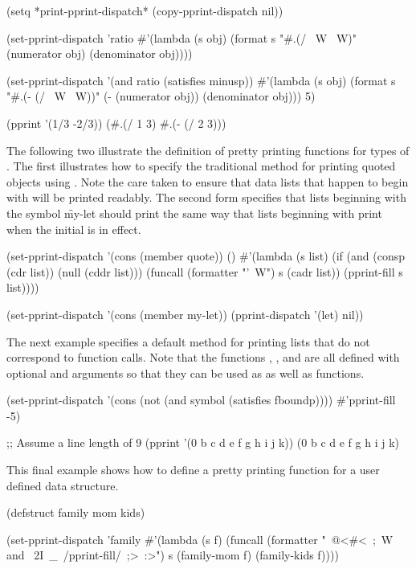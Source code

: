 \code
 (setq *print-pprint-dispatch* (copy-pprint-dispatch nil))

 (set-pprint-dispatch 'ratio
   #'(lambda (s obj)
       (format s "#.(/ ~W ~W)" 
                 (numerator obj) (denominator obj))))

 (set-pprint-dispatch '(and ratio (satisfies minusp))
   #'(lambda (s obj)
       (format s "#.(- (/ ~W ~W))" 
               (- (numerator obj)) (denominator obj)))
   5)

 (pprint '(1/3 -2/3))
 (#.(/ 1 3) \#.(- (/ 2 3)))
\endcode

The following two  illustrate the definition of 
pretty printing functions for types of .  The first
 illustrates how to specify the traditional method 
for printing quoted objects using .  Note
the care taken to ensure that data lists that happen to begin
with  will be printed readably.  The second form 
specifies that lists beginning with the symbol \f{my-let}
should print the same way that lists beginning with 
print when the initial  is in effect.
 
\code
 (set-pprint-dispatch '(cons (member quote)) () 
   #'(lambda (s list)
       (if (and (consp (cdr list)) (null (cddr list)))
          (funcall (formatter "'~W") s (cadr list))
          (pprint-fill s list))))
 
 (set-pprint-dispatch '(cons (member my-let)) 
                      (pprint-dispatch '(let) nil))
\endcode
 
The next example specifies a default method for printing lists that do not
correspond to function calls.  Note that the functions ,
, and  are all defined with
optional  and  arguments so that they can 
be used as  as well as  
functions.

\code
 (set-pprint-dispatch '(cons (not (and symbol (satisfies fboundp))))
                      #'pprint-fill -5)
 
 ;; Assume a line length of 9
 (pprint '(0 b c d e f g h i j k))
 (0 b c d
  e f g h
  i j k)
\endcode 

This final example shows how to define a pretty printing function for a
user defined data structure.
 
\code
 (defstruct family mom kids)
 
 (set-pprint-dispatch 'family
   #'(lambda (s f)
       (funcall (formatter "~@<#<~;~W and ~2I~_~/pprint-fill/~;>~:>")
               s (family-mom f) (family-kids f))))
\endcode
 
